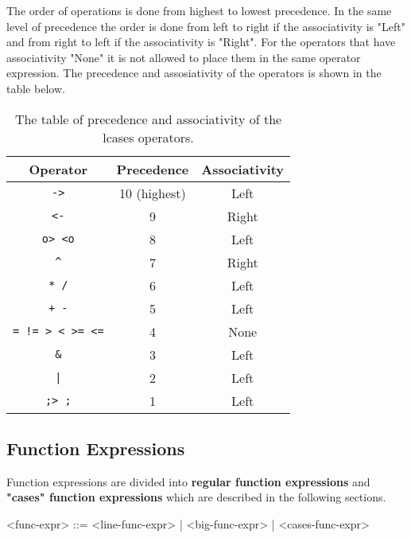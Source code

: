 \documentclass{article}
\begin{document}
\newpage\noindent
The order of operations is done from highest to lowest precedence. In the same
level of precedence the order is done from left to right if the associativity
is "Left" and from right to left if the associativity is "Right". For the
operators that have associativity "None" it is not allowed to place them in the
same operator expression. The precedence and assosiativity of the operators
is shown in the table below.

\begin{table}[h]

\caption{ The table of precedence and associativity of the lcases operators.  }

\begin{center}
\begin{tabular}{ |c|c|c| } 
\hline
Operator & Precedence & Associativity
\\ 
\hline
\hline
\texttt{->} & 10 (highest) & Left
\\
\hline
\texttt{<-} & 9 & Right
\\
\hline
\texttt{o> <o} & 8 & Left
\\
\hline
\texttt{\^} & 7 & Right
\\
\hline
\texttt{* /} & 6 & Left
\\
\hline
\texttt{+ -} & 5 & Left
\\ 
\hline
\texttt{= != > < >= <=} & 4 & None
\\
\hline
\texttt{\&} & 3 & Left
\\
\hline
\texttt{|} & 2 & Left
\\
\hline
\texttt{;> ;} & 1 & Left
\\
\hline
\end{tabular}
\end{center}

\label{table:precassoc}

\end{table}

\newpage
\subsection{Function Expressions}
\label{subsec:funcexprs}

Function expressions are divided into \textbf{regular function expressions} and
\textbf{"cases" function expressions} which are described in the following
sections.
\begin{grammar}
<func-expr> ::= <line-func-expr> | <big-func-expr> | <cases-func-expr>
\end{grammar}
\end{document}
